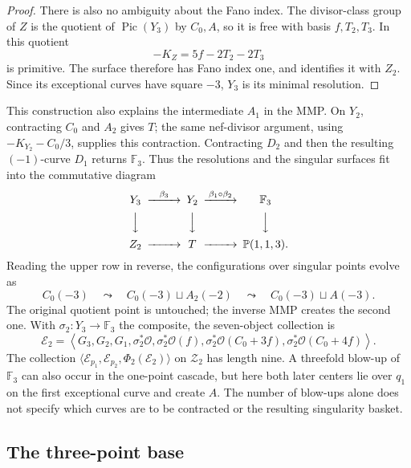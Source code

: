 \documentclass[11pt]{article}
\theoremstyle{plain}
\theoremstyle{definition}
\theoremstyle{remark}
\newcommand{\Pp}{\mathbb P}
\newcommand{\F}{\mathbb F}
\newcommand{\Pic}{\operatorname{Pic}}
\newcommand{\OO}{\mathcal O}
\begin{document}
\begin{proof}
There is also no ambiguity about the Fano index. The divisor-class group
of \(Z\) is the quotient of \(\Pic(Y_3)\) by \(C_0,A\), so it is
free with basis \(f,T_2,T_3\). In this quotient
\[
-K_Z=5f-2T_2-2T_3
\]
is primitive. The surface therefore has Fano index one, and
\cite[Theorem~4 and Remark~7]{Corti2016} identifies it with \(Z_2\).
Since its exceptional curves have square \(-3\), \(Y_3\) is its
minimal resolution.
\end{proof}

This construction also explains the intermediate \(A_1\) in the MMP.
On \(Y_2\), contracting \(C_0\) and \(A_2\) gives \(T\);
the same nef-divisor argument, using \(-K_{Y_2}-C_0/3\), supplies
this contraction. Contracting \(D_2\) and then the resulting
\((-1)\)-curve \(D_1\) returns \(\F_3\). Thus the resolutions
and the singular surfaces fit into the commutative diagram
\[
\begin{CD}
Y_3 @>{\beta_3}>> Y_2 @>{\beta_1\circ\beta_2}>> \F_3\\
@VVV @VVV @VVV\\
Z_2 @>>> T @>>> \Pp(1,1,3).
\end{CD}
\]
Reading the upper row in reverse, the configurations over singular
points evolve as
\[
C_0(-3)\quad\leadsto\quad
C_0(-3)\sqcup A_2(-2)\quad\leadsto\quad
C_0(-3)\sqcup A(-3).
\]
The original quotient point is untouched; the inverse MMP creates the
second one. With \(\sigma_2:Y_3\to\F_3\) the composite, the
seven-object collection is
\[
\mathscr E_2=\left\langle G_3,G_2,G_1,
\sigma_2^*\OO,\sigma_2^*\OO(f),
\sigma_2^*\OO(C_0+3f),\sigma_2^*\OO(C_0+4f)\right\rangle.
\]
The collection
\(\langle\mathcal E_{p_1},\mathcal E_{p_2},\Phi_2(\mathscr E_2)\rangle\)
on \(\mathcal Z_2\) has length nine. A threefold blow-up of \(\F_3\)
can also occur in the one-point cascade, but here both later centers lie
over \(q_1\) on the first exceptional curve and create \(A\).
The number of blow-ups alone does not specify which curves are to be
contracted or the resulting singularity basket.

\subsection{The three-point base}
\label{app:explicit-base-three}
\end{document}
